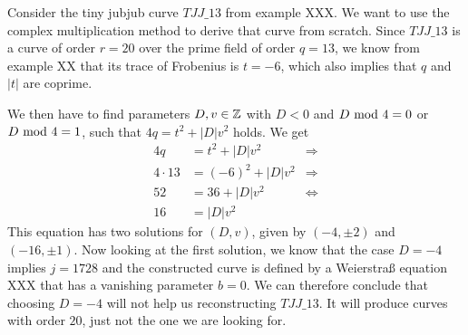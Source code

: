 \begin{example} Consider the tiny jubjub curve $\mathit{TJJ\_13}$ from example XXX. We want to use the complex multiplication method to derive that curve from scratch. Since $\mathit{TJJ\_13}$ is a curve of order $r=20$ over the prime field of order $q=13$, we know from example XX that its trace of Frobenius is $t=-6$, which also implies that $q$ and $|t|$ are coprime. 

We then have to find parameters $D,v\in\mathbb{Z}$ with $D<0$ and $D \text{ mod } 4=0$ or $D \text{ mod } 4=1$, such that $4q = t^2+ |D|v^2$ holds. We get
\begin{align*}
4q & = t^2+ |D|v^2 & \Rightarrow \\
4\cdot 13 & = (-6)^2+ |D|v^2 & \Rightarrow \\
52 & = 36 + |D|v^2 & \Leftrightarrow \\
16 & = |D|v^2
\end{align*}
This equation has two solutions for $(D,v)$, given by $(-4,\pm 2)$ and $(-16,\pm 1)$. Now looking at the first solution, we know that the case $D=-4$ implies $j=1728$ and the constructed curve is defined by a Weierstraß equation XXX that has a vanishing parameter $b=0$. We can therefore conclude that choosing $D=-4$ will not help us reconstructing $\mathit{TJJ\_13}$. It will produce curves with order $20$, just not the one we are looking for.


\end{example}
